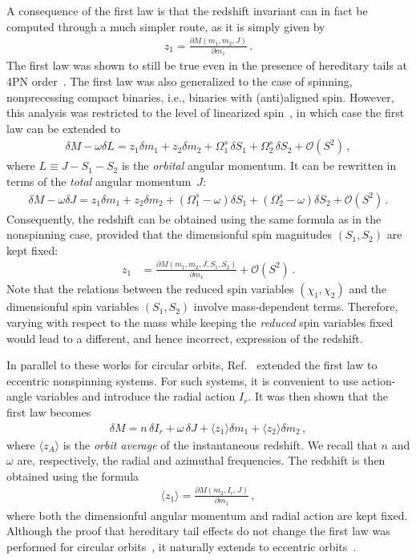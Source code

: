 \documentclass[prd,superscriptaddress,preprintnumbers,tightenlines,nofootinbib, eqsecnum]{revtex4-2}
\begin{document}
A consequence of the first law is that the redshift invariant can in fact be computed through a much simpler route, as  it is simply given by
\begin{align}
    z_1 = \frac{\partial M(m_1,m_2,J)}{\partial m_1} \,.
\end{align}
The first law was shown to still be true even in the presence of hereditary tails at 4PN order~\cite{Blanchet:2017rcn}. The first law was also generalized to the case of spinning, nonprecessing compact binaries, i.e., binaries with (anti)aligned spin. However, this analysis was restricted to the level of linearized spin~\cite{Blanchet:2012at}, in which case the first law can be extended to 
\begin{align}
    \delta M- \omega \delta L = z_1 \delta m_1 + z_2 \delta m_2  + \Omega_1^s\, \delta S_1 + \Omega_2^s \, \delta S_2 + \mathcal{O}(S^2) \,,
\end{align}
where $L \equiv J - S_1 -S_2$ is the \textit{orbital} angular momentum. It can be rewritten in terms of the \textit{total} angular momentum~$J$: 
\begin{align}
    \delta M- \omega \delta J = z_1 \delta m_1 + z_2 \delta m_2 + (\Omega_1^s-\omega) \delta S_1  + (\Omega_2^s-\omega) \delta S_2 + \mathcal{O}(S^2) \,.
\end{align}
Consequently, the redshift can be obtained using the same formula as in the nonspinning case, provided that the dimensionful spin magnitudes $(S_1,S_2)$ are kept fixed:
\begin{align}\label{eq:z1_first_law_linear_in_spin}
    z_1 &= \frac{\partial M(m_1, m_2,J,S_1,S_2)}{\partial m_1} + \mathcal{O}(S^2) \,.
\end{align}
Note that the relations between the reduced spin variables $(\chi_1,\chi_2)$ and  the dimensionful spin variables $(S_1,S_2)$ involve mass-dependent terms. Therefore, varying with respect to the mass while keeping the \textit{reduced} spin variables fixed would lead to a different, and hence incorrect, expression of the redshift.



In parallel to these works for circular orbits, Ref.~\cite{LeTiec:2015kgg} extended the first law to eccentric nonspinning systems. For such systems, it is convenient to use action-angle variables and introduce the radial action $I_r$. It was then shown that the first law becomes 
\begin{align}
    \delta M= n \, \delta I_r + \omega\,\delta J+\langle z_1\rangle \delta m_1 +\langle z_2\rangle \delta m_2\,,
\end{align}
where $\langle z_A\rangle$ is the \textit{orbit average} of the instantaneous redshift. We recall that $n$ and $\omega$ are, respectively, the radial and azimuthal frequencies. The redshift is then obtained using the formula
%
\begin{align}
    \langle z_1 \rangle = \frac{\partial M(m_2,I_r,J)}{\partial m_1} \,,
\end{align}
%
where both the dimensionful angular momentum and radial action are kept fixed. Although the proof that hereditary tail effects do not change the first law was performed for circular orbits~\cite{Blanchet:2017rcn}, it naturally extends to eccentric orbits~\cite{Trestini:2025yyc}.
\end{document}
